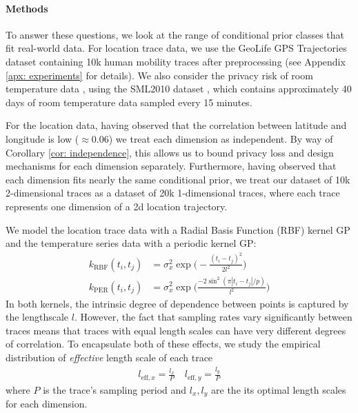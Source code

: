 \paragraph{Methods} To answer these questions, we look at the range of conditional prior classes that fit real-world data. For location trace data, we use the GeoLife GPS Trajectories dataset \citep{geolife} containing 10k human mobility traces after preprocessing (see Appendix \ref{apx: experiments} for details). We also consider the privacy risk of room temperature data \citep{home_monitoring}, using the SML2010 dataset \citep{sml2010}, which contains approximately 40 days of room temperature data sampled every 15 minutes. 

For the location data, having observed that the correlation between latitude and longitude is low ($ \approx 0.06$) we treat each dimension as independent. By way of Corollary \ref{cor: independence}, this allows us to bound privacy loss and design mechanisms for each dimension separately. Furthermore, having observed that each dimension fits nearly the same conditional prior, we treat our dataset of 10k 2-dimensional traces as a dataset of 20k 1-dimensional traces, where each trace represents one dimension of a 2d location trajectory.

We model the location trace data with a Radial Basis Function (RBF) kernel GP and the temperature series data with a periodic kernel GP:
\begin{align*}
	k_{\text{RBF}}(t_i, t_j) 
	&=  \sigma_x^2 \exp \Big( -\frac{(t_i - t_j)^2}{2 l^2} \Big) \\
	k_{\text{PER}}(t_i, t_j) 
	&=  \sigma_x^2 \exp \Big(  \frac{-2 \sin^2(\pi |t_i - t_j| / p)}{l^2} \Big)
\end{align*}
In both kernels, the intrinsic degree of dependence between points is captured by the lengthscale $l$. However, the fact that sampling rates vary significantly between traces means that traces with equal length scales can have very different degrees of correlation. To encapsulate both of these effects, we study the empirical distribution of \emph{effective} length scale of each trace
\begin{align*}
	l_{\text{eff},x} = \frac{l_x}{P}
	\quad
	l_{\text{eff},y} = \frac{l_y}{P}
\end{align*}
where $P$ is the trace's sampling period and $l_x,l_y$ are the its optimal length scales for each dimension. 

